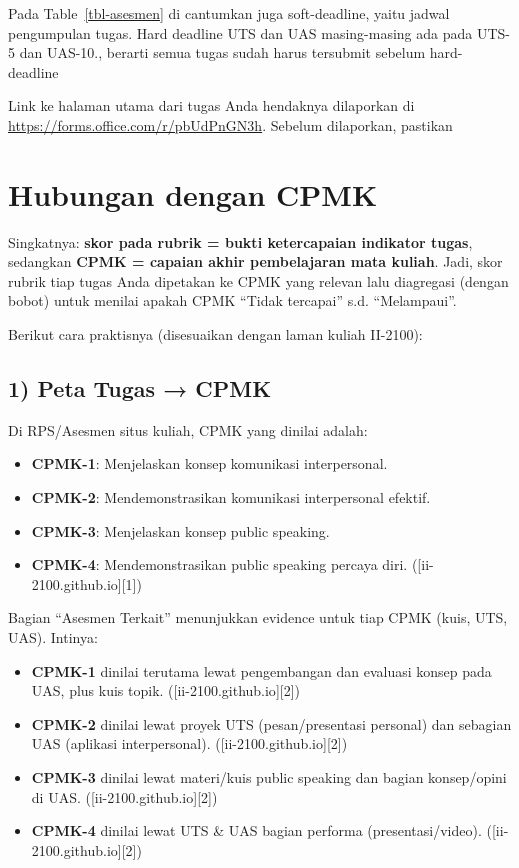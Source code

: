 \documentclass[
  letterpaper,
  DIV=11,
  numbers=noendperiod]{scrreprt}
\providecommand{\tightlist}{%
  \setlength{\itemsep}{0pt}\setlength{\parskip}{0pt}}
\begin{document}
Pada Table~\ref{tbl-asesmen} di cantumkan juga soft-deadline, yaitu
jadwal pengumpulan tugas. Hard deadline UTS dan UAS masing-masing ada
pada UTS-5 dan UAS-10., berarti semua tugas sudah harus tersubmit
sebelum hard-deadline

Link ke halaman utama dari tugas Anda hendaknya dilaporkan di
\url{https://forms.office.com/r/pbUdPnGN3h}. Sebelum dilaporkan,
pastikan

\section*{Hubungan dengan CPMK}\label{hubungan-dengan-cpmk}


Singkatnya: \textbf{skor pada rubrik = bukti ketercapaian indikator
tugas}, sedangkan \textbf{CPMK = capaian akhir pembelajaran mata
kuliah}. Jadi, skor rubrik tiap tugas Anda dipetakan ke CPMK yang
relevan lalu diagregasi (dengan bobot) untuk menilai apakah CPMK ``Tidak
tercapai'' s.d. ``Melampaui''.

Berikut cara praktisnya (disesuaikan dengan laman kuliah II-2100):

\subsection*{1) Peta Tugas → CPMK}\label{peta-tugas-cpmk}

Di RPS/Asesmen situs kuliah, CPMK yang dinilai adalah:

\begin{itemize}
\tightlist
\item
  \textbf{CPMK-1}: Menjelaskan konsep komunikasi interpersonal.
\item
  \textbf{CPMK-2}: Mendemonstrasikan komunikasi interpersonal efektif.
\item
  \textbf{CPMK-3}: Menjelaskan konsep public speaking.
\item
  \textbf{CPMK-4}: Mendemonstrasikan public speaking percaya diri.
  ({[}ii-2100.github.io{]}{[}1{]})
\end{itemize}

Bagian ``Asesmen Terkait'' menunjukkan evidence untuk tiap CPMK (kuis,
UTS, UAS). Intinya:

\begin{itemize}
\tightlist
\item
  \textbf{CPMK-1} dinilai terutama lewat pengembangan dan evaluasi
  konsep pada UAS, plus kuis topik. ({[}ii-2100.github.io{]}{[}2{]})
\item
  \textbf{CPMK-2} dinilai lewat proyek UTS (pesan/presentasi personal)
  dan sebagian UAS (aplikasi interpersonal).
  ({[}ii-2100.github.io{]}{[}2{]})
\item
  \textbf{CPMK-3} dinilai lewat materi/kuis public speaking dan bagian
  konsep/opini di UAS. ({[}ii-2100.github.io{]}{[}2{]})
\item
  \textbf{CPMK-4} dinilai lewat UTS \& UAS bagian performa
  (presentasi/video). ({[}ii-2100.github.io{]}{[}2{]})
\end{itemize}
\end{document}
